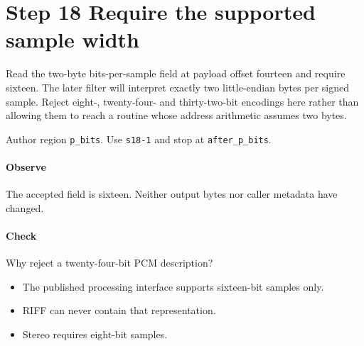 \section{Step 18 Require the supported sample width}\label{pcm-wav-s18}
Read the two-byte bits-per-sample field at payload offset fourteen and require sixteen. The later filter will interpret exactly two little-endian bytes per signed sample. Reject eight-, twenty-four- and thirty-two-bit encodings here rather than allowing them to reach a routine whose address arithmetic assumes two bytes.

Author region \texttt{p\_bits}. Use \texttt{s18-1} and stop at \texttt{after\_p\_bits}.

\paragraph{Observe} The accepted field is sixteen. Neither output bytes nor caller metadata have changed.

\paragraph{Check} Why reject a twenty-four-bit PCM description?
\begin{itemize}
  \item[A.] The published processing interface supports sixteen-bit samples only.
  \item[B.] RIFF can never contain that representation.
  \item[C.] Stereo requires eight-bit samples.
\end{itemize}
